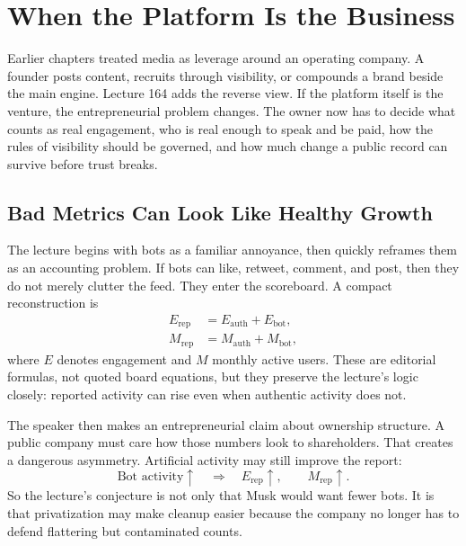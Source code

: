 \documentclass[11pt,oneside]{book}
\begin{document}
\chapter{When the Platform Is the Business}

Earlier chapters treated media as leverage around an operating company. A founder posts content, recruits through visibility, or compounds a brand beside the main engine. Lecture 164 adds the reverse view. If the platform itself is the venture, the entrepreneurial problem changes. The owner now has to decide what counts as real engagement, who is real enough to speak and be paid, how the rules of visibility should be governed, and how much change a public record can survive before trust breaks.

\section{Bad Metrics Can Look Like Healthy Growth}

The lecture begins with bots as a familiar annoyance, then quickly reframes them as an accounting problem. If bots can like, retweet, comment, and post, then they do not merely clutter the feed. They enter the scoreboard. A compact reconstruction is
\begin{align}
E_{\mathrm{rep}} &= E_{\mathrm{auth}} + E_{\mathrm{bot}},\\
M_{\mathrm{rep}} &= M_{\mathrm{auth}} + M_{\mathrm{bot}},
\end{align}
where \(E\) denotes engagement and \(M\) monthly active users. These are editorial formulas, not quoted board equations, but they preserve the lecture's logic closely: reported activity can rise even when authentic activity does not.

The speaker then makes an entrepreneurial claim about ownership structure. A public company must care how those numbers look to shareholders. That creates a dangerous asymmetry. Artificial activity may still improve the report:
\[
\text{Bot activity} \uparrow
\quad\Longrightarrow\quad
E_{\mathrm{rep}} \uparrow,\qquad
M_{\mathrm{rep}} \uparrow.
\]
So the lecture's conjecture is not only that Musk would want fewer bots. It is that privatization may make cleanup easier because the company no longer has to defend flattering but contaminated counts.
\end{document}
